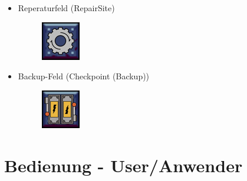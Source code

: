 \documentclass[12pt,a4paper,oneside]{book}
\theoremstyle{plain}
\numberwithin{equation}{chapter} \DeclareMathOperator{\Var}{Var}
\begin{document}
\begin{itemize}
    \newpage
    \item Reperaturfeld (RepairSite)
    \begin{itemize}
        \begin{figure}[h]
            \centering
            \includegraphics{assets/Gear/Gear01.png}
            \label{ConveyorBelt}
        \end{figure}
    \end{itemize}
    
    \item Backup-Feld (Checkpoint (Backup))
    \begin{itemize}
        \begin{figure}[h]
            \centering
            \includegraphics{assets/Checkpoint.png}
            \label{ConveyorBelt}
        \end{figure}
    \end{itemize}
    
\end{itemize}

\chapter{Bedienung - User/Anwender}
\end{document}
